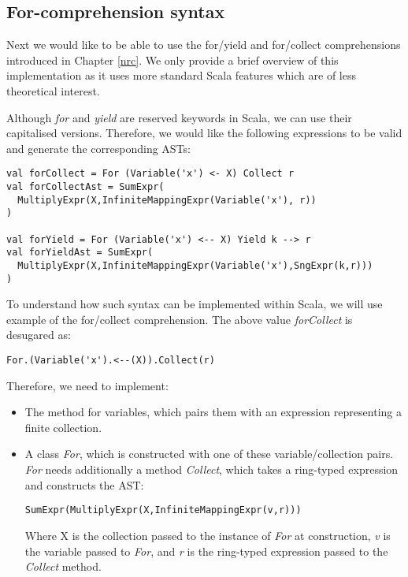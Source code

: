 \subsection{For-comprehension syntax}

Next we would like to be able to use the for/yield and for/collect comprehensions introduced in Chapter \ref{nrc}. We only provide a brief overview of this implementation as it uses more standard Scala features which are of less theoretical interest.

Although \textit{for} and \textit{yield} are reserved keywords in Scala, we can use their capitalised versions. Therefore, we would like the following expressions to be valid and generate the corresponding ASTs:

\vs \begin{lstlisting}
val forCollect = For (Variable('x') <- X) Collect r
val forCollectAst = SumExpr(
  MultiplyExpr(X,InfiniteMappingExpr(Variable('x'), r))
)

val forYield = For (Variable('x') <-- X) Yield k --> r 
val forYieldAst = SumExpr(
  MultiplyExpr(X,InfiniteMappingExpr(Variable('x'),SngExpr(k,r)))
)
\end{lstlisting} \vs

To understand how such syntax can be implemented within Scala, we will use example of the for/collect comprehension. The above value \textit{forCollect} is desugared as:
\vs \begin{lstlisting}
For.(Variable('x').<--(X)).Collect(r)
\end{lstlisting}\vs
Therefore, we need to implement:
\begin{itemize}
\item{The \lin{<--} method for variables, which pairs them with an expression  representing a finite collection.}
\item{A class  \textit{For}, which is constructed with one of these variable/collection pairs. \textit{For} needs additionally a method \textit{Collect}, which takes a ring-typed expression and constructs the AST:
\vs\begin{lstlisting}
SumExpr(MultiplyExpr(X,InfiniteMappingExpr(v,r)))
\end{lstlisting}\vs
Where X is the collection passed to the instance of \textit{For} at construction, \textit{v} is the variable passed to \textit{For}, and \textit{r} is the ring-typed expression passed to the \textit{Collect} method.
}
\end{itemize}

